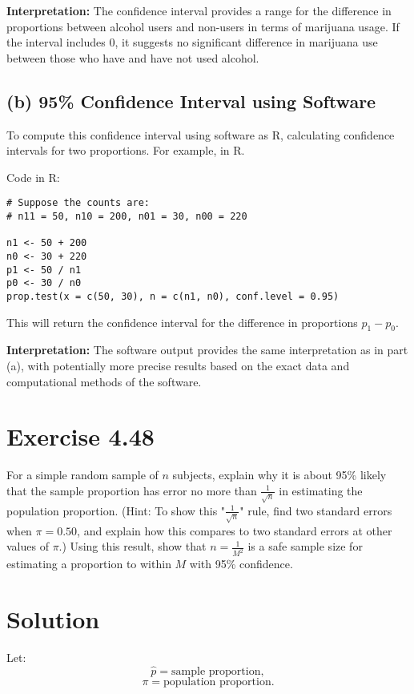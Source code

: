 \documentclass{article}
\begin{document}
\textbf{Interpretation:} The confidence interval provides a range for the difference in proportions between alcohol users and non-users in terms of marijuana usage. If the interval includes 0, it suggests no significant difference in marijuana use between those who have and have not used alcohol.

\subsection*{(b) 95\% Confidence Interval using Software}

To compute this confidence interval using software as R, calculating confidence intervals for two proportions. For example, in R.

Code in R:
\begin{verbatim}
# Suppose the counts are:
# n11 = 50, n10 = 200, n01 = 30, n00 = 220

n1 <- 50 + 200
n0 <- 30 + 220
p1 <- 50 / n1
p0 <- 30 / n0
prop.test(x = c(50, 30), n = c(n1, n0), conf.level = 0.95)
\end{verbatim}

This will return the confidence interval for the difference in proportions \( p_1 - p_0 \).

\textbf{Interpretation:} The software output provides the same interpretation as in part (a), with potentially more precise results based on the exact data and computational methods of the software.

\section*{Exercise 4.48}

For a simple random sample of \( n \) subjects, explain why it is about 95\% likely that the sample proportion has error no more than \( \frac{1}{\sqrt{n}} \) in estimating the population proportion. (Hint: To show this "\( \frac{1}{\sqrt{n}} \)" rule, find two standard errors when \( \pi = 0.50 \), and explain how this compares to two standard errors at other values of \( \pi \).) Using this result, show that \( n = \frac{1}{M^2} \) is a safe sample size for estimating a proportion to within \( M \) with 95\% confidence.

\section*{Solution}

Let:
\[
\hat{p} = \text{sample proportion},
\]
\[
\pi = \text{population proportion}.
\]
\end{document}
